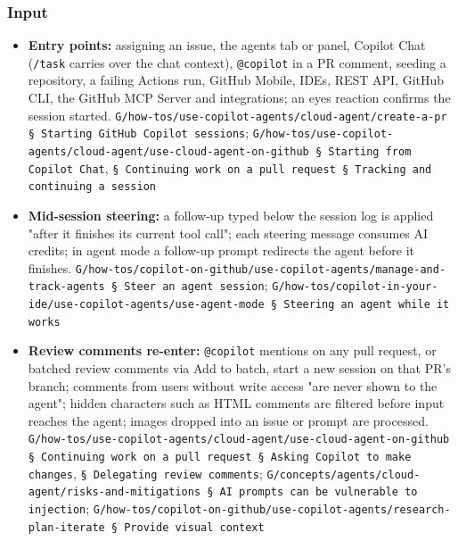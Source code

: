 \subsubsection*{Input}
\begin{itemize}
\item \textbf{Entry points:} assigning an issue, the agents tab or panel, Copilot Chat (\texttt{/\allowbreak{}task} carries over the chat context), \texttt{@copilot} in a PR comment, seeding a repository, a failing Actions run, GitHub Mobile, IDEs, REST API, GitHub CLI, the GitHub MCP Server and integrations; an eyes reaction confirms the session started. \texttt{G/\allowbreak{}how-\allowbreak{}tos/\allowbreak{}use-\allowbreak{}copilot-\allowbreak{}agents/\allowbreak{}cloud-\allowbreak{}agent/\allowbreak{}create-\allowbreak{}a-\allowbreak{}pr § Starting GitHub Copilot sessions}; \texttt{G/\allowbreak{}how-\allowbreak{}tos/\allowbreak{}use-\allowbreak{}copilot-\allowbreak{}agents/\allowbreak{}cloud-\allowbreak{}agent/\allowbreak{}use-\allowbreak{}cloud-\allowbreak{}agent-\allowbreak{}on-\allowbreak{}github § Starting from Copilot Chat}, \texttt{§ Continuing work on a pull request § Tracking and continuing a session}
\item \textbf{Mid-session steering:} a follow-up typed below the session log is applied "after it finishes its current tool call"; each steering message consumes AI credits; in agent mode a follow-up prompt redirects the agent before it finishes. \texttt{G/\allowbreak{}how-\allowbreak{}tos/\allowbreak{}copilot-\allowbreak{}on-\allowbreak{}github/\allowbreak{}use-\allowbreak{}copilot-\allowbreak{}agents/\allowbreak{}manage-\allowbreak{}and-\allowbreak{}track-\allowbreak{}agents § Steer an agent session}; \texttt{G/\allowbreak{}how-\allowbreak{}tos/\allowbreak{}copilot-\allowbreak{}in-\allowbreak{}your-\allowbreak{}ide/\allowbreak{}use-\allowbreak{}copilot-\allowbreak{}agents/\allowbreak{}use-\allowbreak{}agent-\allowbreak{}mode § Steering an agent while it works}
\item \textbf{Review comments re-enter:} \texttt{@copilot} mentions on any pull request, or batched review comments via Add to batch, start a new session on that PR's branch; comments from users without write access "are never shown to the agent"; hidden characters such as HTML comments are filtered before input reaches the agent; images dropped into an issue or prompt are processed. \texttt{G/\allowbreak{}how-\allowbreak{}tos/\allowbreak{}use-\allowbreak{}copilot-\allowbreak{}agents/\allowbreak{}cloud-\allowbreak{}agent/\allowbreak{}use-\allowbreak{}cloud-\allowbreak{}agent-\allowbreak{}on-\allowbreak{}github § Continuing work on a pull request § Asking Copilot to make changes}, \texttt{§ Delegating review comments}; \texttt{G/\allowbreak{}concepts/\allowbreak{}agents/\allowbreak{}cloud-\allowbreak{}agent/\allowbreak{}risks-\allowbreak{}and-\allowbreak{}mitigations § AI prompts can be vulnerable to injection}; \texttt{G/\allowbreak{}how-\allowbreak{}tos/\allowbreak{}copilot-\allowbreak{}on-\allowbreak{}github/\allowbreak{}use-\allowbreak{}copilot-\allowbreak{}agents/\allowbreak{}research-\allowbreak{}plan-\allowbreak{}iterate § Provide visual context}

\end{itemize}
